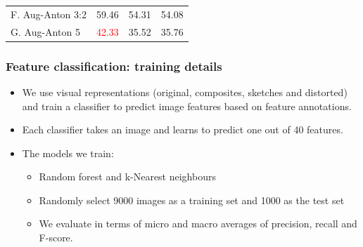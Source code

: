 \documentclass[aspectratio=1610]{beamer} %
\begin{document}
\begin{frame}
\begin{table}[htbp]
{\begin{tabular}{|l|rrr|}
F. Aug-Anton 3:2 & 59.46                                                    & 54.31                                                 & 54.08                                                     \\
G. Aug-Anton 5  & \textcolor{red}{42.33}                                                    & 35.52                                                     & 35.76                                                      \\
\hline
\end{tabular}
}
\label{fig:results}
\end{table}
\end{frame}


\begin{frame}
\frametitle{Feature classification: training details}
\begin{itemize}


	\item We use visual representations (original, composites, sketches and distorted) and train a classifier to predict image features based on feature annotations.
	\item Each classifier takes an image and learns to predict one out of 40 features.
	\pause
	\item The models we train:
		\begin{itemize}
			\item Random forest and k-Nearest neighbours
			\item Randomly select 9000 images as a training set and 1000 as the test set
			\item We evaluate in terms of micro and macro averages of precision, recall and F-score.
		\end{itemize}

\end{itemize}
\end{frame}


\end{document}
